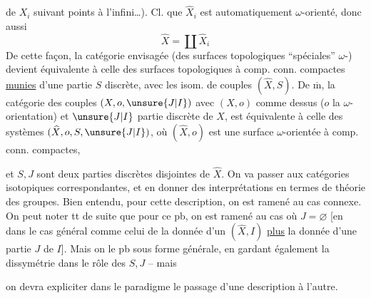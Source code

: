  de $X_i$ suivant  points à l'infini\ldots).
Cl. que $\widehat X_i$ est automatiquement $\omega$-orienté,
donc aussi
\[\widehat X=\coprod\widehat X_i\]
De cette façon, la catégorie envisagée
(des surfaces topologiques ``spéciales''
$\omega$-) devient équivalente à
celle des surfaces topologiques 
à comp. conn. compactes \uline{munies}
d'une partie  $S$ discrète,
avec les isom. de couples $(\widehat X,S)$.
De $\overline{\mathrm m}$, la catégorie des couples
 $(X,o,\unsure{J|I})$ avec $(X,o)$ comme
dessus ($o$ la $\omega$-orientation) et
$\unsure{J|I}$ partie discrète de $X$, est équivalente à celle des systèmes
$(\widehat X,o,S,\unsure{J|I})$, où $(\widehat X,o)$ est une surface
$\omega$-orientée à comp. conn. compactes,

et $S,J$ sont deux parties discrètes
disjointes de $\widehat X$.
On va  passer aux catégories
isotopiques correspondantes, et
en donner des interprétations
en termes de théorie des groupes.
Bien entendu, pour cette description,
on est ramené au cas connexe.
On peut  noter tt de suite
que pour ce pb, on est ramené
au cas où $J=\varnothing$ [en 
dans le cas général comme celui
de la donnée d'un $(\widehat X,I)$
\uline{plus} la donnée d'une partie $J$
de $I$].
Mais on  le
pb sous  forme générale, en
gardant également la dissymétrie
dans le rôle des $S,J$ -- mais

on devra expliciter dans le paradigme
le passage d'une description à
l'autre.


